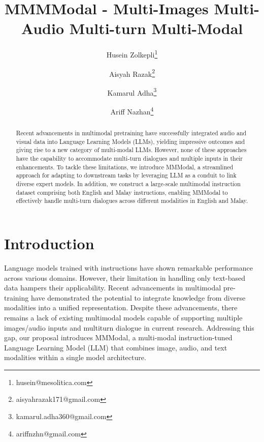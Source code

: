 \documentclass[preprint]{article}
\title{MMMModal - Multi-Images Multi-Audio Multi-turn Multi-Modal}
\author{
  Husein Zolkepli\thanks{husein@mesolitica.com} \and
  Aisyah Razak\thanks{aisyahrazak171@gmail.com} \and
  Kamarul Adha\thanks{kamarul.adha360@gmail.com} \and
  Ariff Nazhan\thanks{ariffnzhn@gmail.com}
}
\begin{document}
\maketitle

\begin{abstract}
  
Recent advancements in multimodal pretraining have successfully integrated audio and visual data into Language Learning Models (LLMs), yielding impressive outcomes and giving rise to a new category of multi-modal LLMs. However, none of these approaches have the capability to accommodate multi-turn dialogues and multiple inputs in their enhancements. To tackle these limitations, we introduce MMModal, a streamlined approach for adapting to downstream tasks by leveraging LLM as a conduit to link diverse expert models. In addition, we construct a large-scale multimodal instruction dataset comprising both English and Malay instructions, enabling MMModal to effectively handle multi-turn dialogues across different modalities in English and Malay.
\end{abstract}

\section{Introduction}

Language models trained with instructions have shown remarkable performance across various domains. However, their limitation in handling only text-based data hampers their applicability. Recent advancements in multimodal pre-training have demonstrated the potential to integrate knowledge from diverse modalities into a unified representation.\cite{lyu2023macawllm}\cite{liu2023visual} Despite these advancements, there remains a lack of existing multimodal models capable of supporting multiple images/audio inputs and multiturn dialogue in current research. Addressing this gap, our proposal introduces MMModal, a multi-modal instruction-tuned Language Learning Model (LLM) that combines image, audio, and text modalities within a single model architecture.
\end{document}
